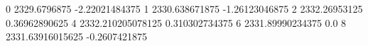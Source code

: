 0 2329.6796875 -2.22021484375
1 2330.638671875 -1.26123046875
2 2332.26953125 0.36962890625
4 2332.210205078125 0.310302734375
6 2331.89990234375 0.0
8 2331.63916015625 -0.2607421875
